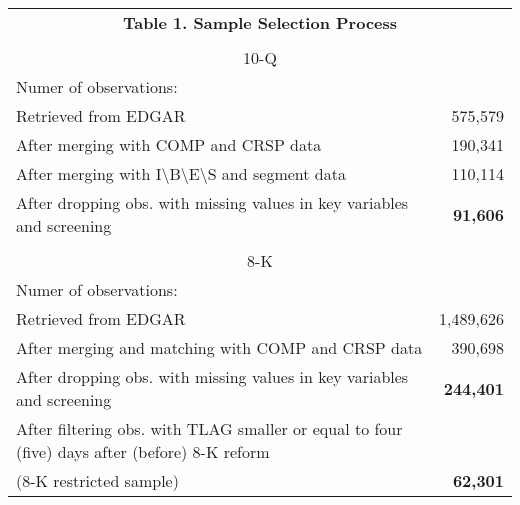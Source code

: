 \begin{table}[htbp] \label{T1}
  \centering
    \begin{tabular}{lr}
    \multicolumn{2}{c}{\textbf{Table 1. Sample Selection Process}} \\
    \\
    \multicolumn{2}{c}{10-Q} \\
    Numer of observations: &  \\
    Retrieved from EDGAR & 575,579 \\
    After merging with COMP and CRSP data & 190,341 \\
    After merging with I\textbackslash{}B\textbackslash{}E\textbackslash{}S and segment data & 110,114 \\
    After dropping obs. with missing values in key variables and screening & \textbf{91,606} \\
      &  \\
    \multicolumn{2}{c}{8-K} \\
    Numer of observations: &  \\
    Retrieved from EDGAR & 1,489,626 \\
    After merging and matching with COMP and CRSP data & 390,698 \\
    After dropping obs. with missing values in key variables and screening & \textbf{244,401} \\
    After filtering obs. with TLAG smaller or equal to four (five) days after (before) 8-K reform & \\
    (8-K restricted sample) & \textbf{62,301} 
    \end{tabular}%
\end{table}%
